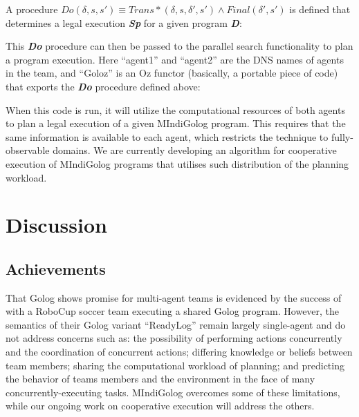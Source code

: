 {\small  }{\small \par}

A procedure $Do(\delta,s,s')\equiv Trans*(\delta,s,\delta',s')\wedge Final(\delta',s')$
is defined that determines a legal execution \textbf{\emph{Sp}} for
a given program \textbf{\emph{D}}:

{\small  }{\small \par}

This \textbf{\emph{Do}} procedure can then be passed to the parallel
search functionality to plan a program execution. Here {}``agent1''
and {}``agent2'' are the DNS names of agents in the team, and {}``Goloz''
is an Oz functor (basically, a portable piece of code) that exports
the \textbf{\emph{Do}} procedure defined above:

{\small  }{\small \par}

When this code is run, it will utilize the computational resources
of both agents to plan a legal execution of a given MIndiGolog program.
This requires that the same information is available to each agent,
which restricts the technique to fully-observable domains. We are
currently developing an algorithm for cooperative execution of MIndiGolog
programs that utilises such distribution of the planning workload.


\section{Discussion\label{sec:MIndiGolog:Discussion}}


\subsection{Achievements}

That Golog shows promise for multi-agent teams is evidenced by the
success of \citet{Ferrein2005readylog} with a RoboCup soccer team
executing a shared Golog program. However, the semantics of their
Golog variant {}``ReadyLog'' remain largely single-agent and do
not address concerns such as: the possibility of performing actions
concurrently and the coordination of concurrent actions; differing
knowledge or beliefs between team members; sharing the computational
workload of planning; and predicting the behavior of teams members
and the environment in the face of many concurrently-executing tasks.
MIndiGolog overcomes some of these limitations, while our ongoing
work on cooperative execution will address the others.

